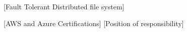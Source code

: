 

[Fault Tolerant Distributed file system]{
}

[AWS and Azure Certifications] {
}
[Position of responsibility]{
}
